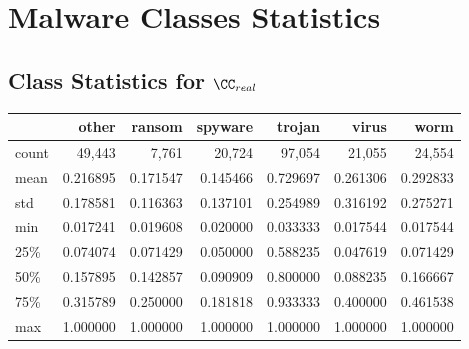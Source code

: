 
\chapter{Malware Classes Statistics}
\label{chapter:appendixClasses}
\centering
\section{Class Statistics for $\CC_{real}$}

\begin{tabular}{lrrrrrr}
	\toprule
	{} &         other &       ransom &       spyware &        trojan &         virus &          worm \\
	\midrule
	count &  49,443 &  7,761 &  20,724 &  97,054 &  21,055 &  24,554 \\
	mean  &      0.216895 &     0.171547 &      0.145466 &      0.729697 &      0.261306 &      0.292833 \\
	std   &      0.178581 &     0.116363 &      0.137101 &      0.254989 &      0.316192 &      0.275271 \\
	min   &      0.017241 &     0.019608 &      0.020000 &      0.033333 &      0.017544 &      0.017544 \\
	25\%   &      0.074074 &     0.071429 &      0.050000 &      0.588235 &      0.047619 &      0.071429 \\
	50\%   &      0.157895 &     0.142857 &      0.090909 &      0.800000 &      0.088235 &      0.166667 \\
	75\%   &      0.315789 &     0.250000 &      0.181818 &      0.933333 &      0.400000 &      0.461538 \\
	max   &      1.000000 &     1.000000 &      1.000000 &      1.000000 &      1.000000 &      1.000000 \\
	\bottomrule
\end{tabular}

